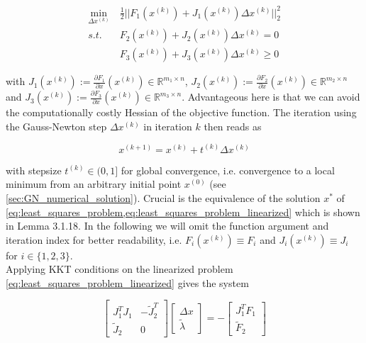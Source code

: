 \documentclass{scrartcl}[12pt, halfparskip]
\numberwithin{equation}{section}
\numberwithin{figure}{section}
\numberwithin{table}{section}
\begin{document}
\begin{align}
\min_{\Delta x^{(k)}} \ & \frac{1}{2}|| F_1(x^{(k)}) + J_1(x^{(k)}) \Delta x^{(k)} ||_2^2 \label{eq:least_squares_problem_linearized} \\
s.t. \ & F_2(x^{(k)}) + J_2(x^{(k)}) \Delta x^{(k)} = 0 \nonumber \\
& F_3(x^{(k)}) + J_3(x^{(k)}) \Delta x^{(k)} \ge 0 \nonumber
\end{align}

with $J_1(x^{(k)}) := \frac{\partial F_1}{\partial x}(x^{(k)}) \in \mathbb{R}^{m_1 \times n}$, $J_2(x^{(k)}) := \frac{\partial F_2}{\partial x}(x^{(k)}) \in \mathbb{R}^{m_2 \times n}$ and $J_3(x^{(k)}) := \frac{\partial F_3}{\partial x}(x^{(k)}) \in \mathbb{R}^{m_3 \times n}$. Advantageous here is that we can avoid the computationally costly Hessian of the objective function. The iteration using the Gauss-Newton step $\Delta x^{(k)}$ in iteration $k$ then reads as

\begin{equation}
x^{(k+1)} = x^{(k)} + t^{(k)} \Delta x^{(k)}
\label{eq:Gauss_Newton_iteration}
\end{equation}

with stepsize $t^{(k)} \in (0,1]$ for global convergence, i.e. convergence to a local minimum from an arbitrary initial point $x^{(0)}$ (see \cref{sec:GN_numerical_solution}). Crucial is the equivalence of the solution $x^*$ of \cref{eq:least_squares_problem,eq:least_squares_problem_linearized} which is shown in \cite{diss_bock} Lemma 3.1.18.
In the following we will omit the function argument and iteration index for better readability, i.e. $F_i(x^{(k)}) \equiv F_i$ and $J_i(x^{(k)}) \equiv J_i$ for $i \in \{1,2,3\}$. \\

Applying KKT conditions on the linearized problem \cref{eq:least_squares_problem_linearized} gives the system

\begin{equation}
	\begin{bmatrix}
		J_1^T J_1 & -\tilde{J}_2^T \\
		\tilde{J}_2 & 0
	\end{bmatrix}
	\begin{bmatrix}
		\Delta x \\
		\tilde{\lambda}
	\end{bmatrix}
	= -
	\begin{bmatrix}
	J_1^T F_1 \\
	\tilde{F}_2
	\end{bmatrix}
	\label{eq:GN_KKT_system}
\end{equation}
\end{document}
